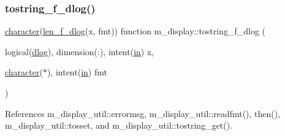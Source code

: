 \subsubsection{\texorpdfstring{tostring\+\_\+f\+\_\+dlog()}{tostring\_f\_dlog()}}
{\footnotesize\ttfamily \hyperlink{option__stopwatch_83_8txt_abd4b21fbbd175834027b5224bfe97e66}{character}(\hyperlink{namespacem__display_a2a298a8f2faf00047152b93cd265d396}{len\+\_\+f\+\_\+dlog}(x, fmt)) function m\+\_\+display\+::tostring\+\_\+f\+\_\+dlog (\begin{DoxyParamCaption}\item[{logical(\hyperlink{namespacem__display_a8c6a3df510feabf6bc84dd0a8789f98c}{dlog}), dimension(\+:), intent(\hyperlink{M__journal_83_8txt_afce72651d1eed785a2132bee863b2f38}{in})}]{x,  }\item[{\hyperlink{option__stopwatch_83_8txt_abd4b21fbbd175834027b5224bfe97e66}{character}($\ast$), intent(\hyperlink{M__journal_83_8txt_afce72651d1eed785a2132bee863b2f38}{in})}]{fmt }\end{DoxyParamCaption})\hspace{0.3cm}{\ttfamily [private]}}



References m\+\_\+display\+\_\+util\+::errormsg, m\+\_\+display\+\_\+util\+::readfmt(), then(), m\+\_\+display\+\_\+util\+::tosset, and m\+\_\+display\+\_\+util\+::tostring\+\_\+get().

